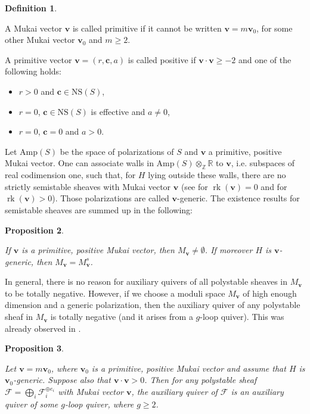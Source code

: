 \documentclass[11pt,english]{article}
\numberwithin{equation}{section}
\numberwithin{figure}{section}
\theoremstyle{definition}
\newtheorem{df}{Definition}[subsection]
\theoremstyle{plain}
\newtheorem{prop}[df]{Proposition}
\theoremstyle{remark}
\DeclareMathOperator{\rk}{rk}
\newcommand\RR{\mathbb{R}}
\begin{document}
\begin{df} \label{Def/PrimPosMukVec}

A Mukai vector $\textbf{v}$ is called primitive if it cannot be written
$\textbf{v}=m\textbf{v}_{0}$, for some other Mukai vector $\textbf{v}_{0}$
and $m\geq2$.

A primitive vector $\textbf{v}=(r,\textbf{c},a)$ is called positive
if $\textbf{v}\cdot\textbf{v}\geq-2$ and one of the following holds:
\begin{itemize}
\item $r>0$ and $\textbf{c}\in\mathrm{NS}(S)$,
\item $r=0$, $\textbf{c}\in\mathrm{NS}(S)$ is effective and $a\ne0$,
\item $r=0$, $\textbf{c}=0$ and $a>0$.
\end{itemize}
\end{df}

Let $\text{Amp}(S)$ be the space of polarizations of $S$ and $\textbf{v}$
a primitive, positive Mukai vector. One can associate walls in $\text{Amp}(S)\otimes_{\mathbb{Z}}\RR$
to $\textbf{v}$, i.e. subspaces of real codimension one, such that,
for $H$ lying outside these walls, there are no strictly semistable
sheaves with Mukai vector $\textbf{v}$ (see \cite[\S1.4.]{Yos01}
for $\rk(\textbf{v})=0$ and \cite[Ch. 4.C.]{HL10} for $\rk(\textbf{v})>0$).
Those polarizations are called $\textbf{v}$-generic. The existence
results for semistable sheaves are summed up in the following:

\begin{prop}{\cite[Thm. 2.2-4.]{AS18}} \label{Prop/ExisStabShK3}

If $\textbf{v}$ is a primitive, positive Mukai vector, then $M_{\textbf{v}}\ne\emptyset$.
If moreover $H$ is $\textbf{v}$-generic, then $M_{\textbf{v}}=M_{\textbf{v}}^{s}$.

\end{prop}

In general, there is no reason for auxiliary quivers of all polystable
sheaves in $M_{\textbf{v}}$ to be totally negative. However, if we
choose a moduli space $M_{\textbf{v}}$ of high enough dimension and
a generic polarization, then the auxiliary quiver of any polystable
sheaf in $M_{\textbf{v}}$ is totally negative (and it arises from
a $g$-loop quiver). This was already observed in \cite{BZ19}.

\begin{prop} \label{Prop/ExtQuivK3}

Let $\textbf{v}=m\textbf{v}_{0}$, where $\textbf{v}_{0}$ is a primitive,
positive Mukai vector and assume that $H$ is $\textbf{v}_{0}$-generic.
Suppose also that $\textbf{v}\cdot\textbf{v}>0$. Then for any polystable
sheaf $\mathcal{F}=\bigoplus_{i}\mathcal{F}_{i}^{\oplus e_{i}}$ with
Mukai vector $\textbf{v}$, the auxiliary quiver of $\mathcal{F}$
is an auxiliary quiver of some $g$-loop quiver, where $g\geq2$.

\end{prop}
\end{document}
